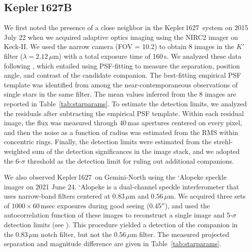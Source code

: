 \documentclass[12pt,modern,twocolumn,tighten,linenumbers]{aastex63}
\newcommand{\sn}{Kepler\,1627} %
\begin{document}
\subsection{Kepler\,1627B}

We first noted the presence of a close neighbor in the \sn\ system on
2015 July 22 when we acquired adaptive optics imaging using the NIRC2
imager on Keck-II.  We used the narrow camera (FOV = 10.2\arcsec) to
obtain 8 images in the $K'$ filter ($\lambda = 2.12\,\mu$m) with a
total exposure time of 160\,s. We analyzed these data following
\citet{kraus_impact_2016}, which entailed using PSF-fitting to measure
the separation, position angle, and contrast of the candidate
companion.  The best-fitting empirical PSF template was identified
from among the near-contemporaneous observations of single stars in
the same filter.  The mean values inferred from the 8 images are
reported in Table~\ref{tab:starparams}.  To estimate the detection
limits, we analyzed the residuals after subtracting the empirical PSF
template. Within each residual image, the flux was measured through
40\,mas apertures centered on every pixel, and then the noise as a
function of radius was estimated from the RMS within concentric rings.
Finally, the detection limits were estimated from the strehl-weighted
sum of the detection significances in the image stack, and we adopted
the $6$-$\sigma$ threshold as the detection limit for ruling out
additional companions.

We also observed \sn\ on Gemini-North using the `Alopeke speckle
imager on 2021 June 24.  `Alopeke is a dual-channel speckle
interferometer that uses narrow-band filters centered at 0.83\,$\mu$m
and $0.56\,\mu$m.  We acquired three sets of $1000\times 60$$\,$msec
exposures during good seeing (0.45$''$), and used the autocorrelation
function of these images to reconstruct a single image and 5-$\sigma$
detection limits (see \citealt{howell_speckle_2011}).  This procedure
yielded a detection of the companion in the 0.83\,$\mu$m notch filter,
but not the $0.56\,\mu$m filter.  The measured projected separation
and magnitude difference are given in Table~\ref{tab:starparams}.
\end{document}
